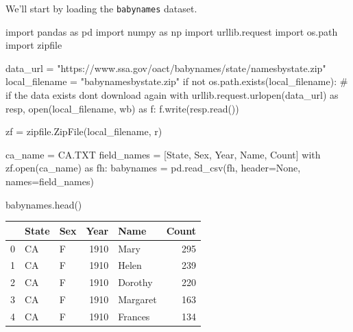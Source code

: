 \documentclass[
  letterpaper,
  DIV=11,
  numbers=noendperiod]{scrreprt}
\newenvironment{Shaded}{\begin{snugshade}}{\end{snugshade}}
\newcommand{\BuiltInTok}[1]{\textcolor[rgb]{0.00,0.23,0.31}{#1}}
\newcommand{\CommentTok}[1]{\textcolor[rgb]{0.37,0.37,0.37}{#1}}
\newcommand{\ControlFlowTok}[1]{\textcolor[rgb]{0.00,0.23,0.31}{#1}}
\newcommand{\ImportTok}[1]{\textcolor[rgb]{0.00,0.46,0.62}{#1}}
\newcommand{\KeywordTok}[1]{\textcolor[rgb]{0.00,0.23,0.31}{#1}}
\newcommand{\NormalTok}[1]{\textcolor[rgb]{0.00,0.23,0.31}{#1}}
\newcommand{\OperatorTok}[1]{\textcolor[rgb]{0.37,0.37,0.37}{#1}}
\newcommand{\StringTok}[1]{\textcolor[rgb]{0.13,0.47,0.30}{#1}}
\newcommand{\VariableTok}[1]{\textcolor[rgb]{0.07,0.07,0.07}{#1}}
\begin{document}
We'll start by loading the \texttt{babynames} dataset.

\begin{Shaded}
\begin{Highlighting}[]
\ImportTok{import}\NormalTok{ pandas }\ImportTok{as}\NormalTok{ pd}
\ImportTok{import}\NormalTok{ numpy }\ImportTok{as}\NormalTok{ np}
\ImportTok{import}\NormalTok{ urllib.request}
\ImportTok{import}\NormalTok{ os.path}
\ImportTok{import}\NormalTok{ zipfile}

\NormalTok{data\_url }\OperatorTok{=} \StringTok{"https://www.ssa.gov/oact/babynames/state/namesbystate.zip"}
\NormalTok{local\_filename }\OperatorTok{=} \StringTok{"babynamesbystate.zip"}
\ControlFlowTok{if} \KeywordTok{not}\NormalTok{ os.path.exists(local\_filename): }\CommentTok{\# if the data exists don\textquotesingle{}t download again}
    \ControlFlowTok{with}\NormalTok{ urllib.request.urlopen(data\_url) }\ImportTok{as}\NormalTok{ resp, }\BuiltInTok{open}\NormalTok{(local\_filename, }\StringTok{\textquotesingle{}wb\textquotesingle{}}\NormalTok{) }\ImportTok{as}\NormalTok{ f:}
\NormalTok{        f.write(resp.read())}

\NormalTok{zf }\OperatorTok{=}\NormalTok{ zipfile.ZipFile(local\_filename, }\StringTok{\textquotesingle{}r\textquotesingle{}}\NormalTok{)}

\NormalTok{ca\_name }\OperatorTok{=} \StringTok{\textquotesingle{}CA.TXT\textquotesingle{}}
\NormalTok{field\_names }\OperatorTok{=}\NormalTok{ [}\StringTok{\textquotesingle{}State\textquotesingle{}}\NormalTok{, }\StringTok{\textquotesingle{}Sex\textquotesingle{}}\NormalTok{, }\StringTok{\textquotesingle{}Year\textquotesingle{}}\NormalTok{, }\StringTok{\textquotesingle{}Name\textquotesingle{}}\NormalTok{, }\StringTok{\textquotesingle{}Count\textquotesingle{}}\NormalTok{]}
\ControlFlowTok{with}\NormalTok{ zf.}\BuiltInTok{open}\NormalTok{(ca\_name) }\ImportTok{as}\NormalTok{ fh:}
\NormalTok{    babynames }\OperatorTok{=}\NormalTok{ pd.read\_csv(fh, header}\OperatorTok{=}\VariableTok{None}\NormalTok{, names}\OperatorTok{=}\NormalTok{field\_names)}

\NormalTok{babynames.head()}
\end{Highlighting}
\end{Shaded}

\begin{tabular}{lllrlr}
\toprule
{} & State & Sex &  Year &      Name &  Count \\
\midrule
0 &    CA &   F &  1910 &      Mary &    295 \\
1 &    CA &   F &  1910 &     Helen &    239 \\
2 &    CA &   F &  1910 &   Dorothy &    220 \\
3 &    CA &   F &  1910 &  Margaret &    163 \\
4 &    CA &   F &  1910 &   Frances &    134 \\
\bottomrule
\end{tabular}
\end{document}
